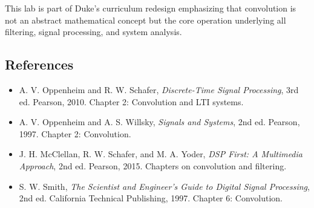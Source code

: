\documentclass[11pt,letterpaper]{article}
\begin{document}
This lab is part of Duke's curriculum redesign emphasizing that convolution is not an abstract mathematical concept but the core operation underlying all filtering, signal processing, and system analysis.

\subsection*{References}

\begin{itemize}
    \item A. V. Oppenheim and R. W. Schafer, \textit{Discrete-Time Signal Processing}, 3rd ed. Pearson, 2010. Chapter 2: Convolution and LTI systems.
    \item A. V. Oppenheim and A. S. Willsky, \textit{Signals and Systems}, 2nd ed. Pearson, 1997. Chapter 2: Convolution.
    \item J. H. McClellan, R. W. Schafer, and M. A. Yoder, \textit{DSP First: A Multimedia Approach}, 2nd ed. Pearson, 2015. Chapters on convolution and filtering.
    \item S. W. Smith, \textit{The Scientist and Engineer's Guide to Digital Signal Processing}, 2nd ed. California Technical Publishing, 1997. Chapter 6: Convolution.
\end{itemize}
\end{document}

